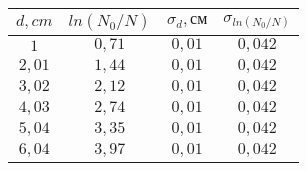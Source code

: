 \begin{tabular}{| c | c | c | c |}
\hline
$d, cm$ & $ln(N_0/N)$ & $\sigma_{d}, см$ & $\sigma_{ln(N_0/N)}$\\
\hline
$1$ & $0,71$ & $0,01$ & $0,042$\\
\hline
$2,01$ & $1,44$ & $0,01$ & $0,042$\\
\hline
$3,02$ & $2,12$ & $0,01$ & $0,042$\\
\hline
$4,03$ & $2,74$ & $0,01$ & $0,042$\\
\hline
$5,04$ & $3,35$ & $0,01$ & $0,042$\\
\hline
$6,04$ & $3,97$ & $0,01$ & $0,042$\\
\hline
\end{tabular}
